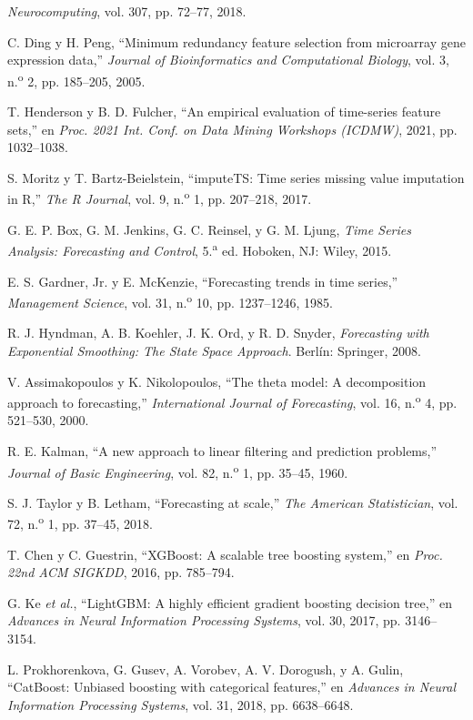 \documentclass[12pt,letterpaper]{report}
\begin{document}
{\begin{enumerate}[label={[\arabic*]}, leftmargin=*, itemsep=0pt, parsep=0pt, topsep=0pt]
\textit{Neurocomputing}, vol. 307, pp. 72--77, 2018.
\item\label{bib:21} C. Ding y H. Peng, ``Minimum redundancy feature selection from
microarray gene expression data,'' \textit{Journal of Bioinformatics and Computational
Biology}, vol. 3, n.\textsuperscript{o} 2, pp. 185--205, 2005.
\item\label{bib:22} T. Henderson y B. D. Fulcher, ``An empirical evaluation of
time-series feature sets,'' en \textit{Proc. 2021 Int. Conf. on Data Mining Workshops (ICDMW)}, 2021, pp. 1032--1038.
\item\label{bib:23} S. Moritz y T. Bartz-Beielstein, ``imputeTS: Time series missing
value imputation in R,'' \textit{The R Journal}, vol. 9, n.\textsuperscript{o} 1,
pp. 207--218, 2017.
\item\label{bib:24} G. E. P. Box, G. M. Jenkins, G. C. Reinsel, y G. M. Ljung,
\textit{Time Series Analysis: Forecasting and Control}, 5.\textsuperscript{a} ed.
Hoboken, NJ: Wiley, 2015.
\item\label{bib:25} E. S. Gardner, Jr. y E. McKenzie, ``Forecasting trends in time series,'' \textit{Management Science}, vol. 31, n.\textsuperscript{o} 10, pp. 1237--1246, 1985.
\item\label{bib:26} R. J. Hyndman, A. B. Koehler, J. K. Ord, y R. D. Snyder, \textit{Forecasting with Exponential Smoothing: The State Space Approach}. Berlín: Springer, 2008.
\item\label{bib:27} V. Assimakopoulos y K. Nikolopoulos, ``The theta model: A decomposition approach to forecasting,'' \textit{International Journal of Forecasting}, vol. 16, n.\textsuperscript{o} 4, pp. 521--530, 2000.
\item\label{bib:28} R. E. Kalman, ``A new approach to linear filtering and prediction problems,'' \textit{Journal of Basic Engineering}, vol. 82, n.\textsuperscript{o} 1, pp. 35--45, 1960.
\item\label{bib:29} S. J. Taylor y B. Letham, ``Forecasting at scale,'' \textit{The
American Statistician}, vol. 72, n.\textsuperscript{o} 1, pp. 37--45, 2018.
\item\label{bib:30} T. Chen y C. Guestrin, ``XGBoost: A scalable tree boosting
system,'' en \textit{Proc. 22nd ACM SIGKDD}, 2016, pp. 785--794.
\item\label{bib:31} G. Ke \textit{et al.}, ``LightGBM: A highly efficient gradient boosting decision tree,'' en \textit{Advances in Neural Information Processing Systems}, vol. 30, 2017, pp. 3146--3154.
\item\label{bib:32} L. Prokhorenkova, G. Gusev, A. Vorobev, A. V. Dorogush, y A. Gulin, ``CatBoost: Unbiased boosting with categorical features,'' en \textit{Advances in Neural Information Processing Systems}, vol. 31, 2018, pp. 6638--6648.

\end{enumerate}}
\end{document}
